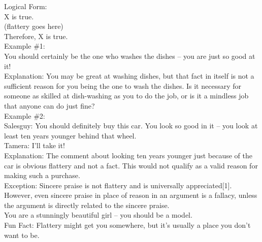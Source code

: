 \documentclass[a4paper,12pt,single,pdftex]{scrartcl}
\begin{document}
    
      Logical Form:
    \\

    
      X is true.
    \\

    
      (flattery goes here)
    \\

    
      Therefore, X is true.
    \\

    
      Example \#1:
    \\

    
      You should certainly be the one who washes the dishes -- you are just so good at it!
    \\

    
      Explanation: You may be great at washing dishes, but that fact in itself is not a sufficient reason for you being the one to wash the dishes.  Is it necessary for someone as skilled at dish-washing as you to do the job, or is it a mindless job that anyone can do just fine?
    \\

    
      Example \#2:
    \\

    
      Salesguy: You should definitely buy this car.  You look so good in it -- you look at least ten years younger behind that wheel.
    \\

    
      Tamera: I’ll take it!
    \\

    
      Explanation: The comment about looking ten years younger just because of the car is obvious flattery and not a fact.  This would not qualify as a valid reason for making such a purchase.
    \\

    
      Exception: Sincere praise is not flattery and is universally appreciated[1].  However, even sincere praise in place of reason in an argument is a fallacy, unless the argument is directly related to the sincere praise.
    \\

    
      You are a stunningly beautiful girl -- you should be a model.
    \\

    
      Fun Fact: Flattery might get you somewhere, but it’s usually a place you don’t want to be.
    \\
\end{document}
